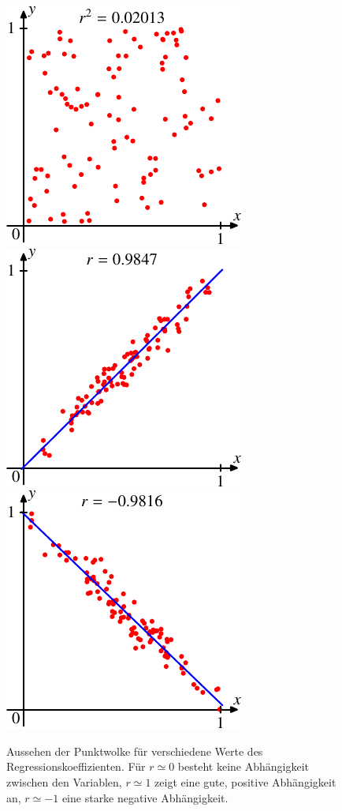 \begin{figure}
\centering
\includegraphics{images/regression-2.pdf}\;
\includegraphics{images/regression-3.pdf}\;
\includegraphics{images/regression-4.pdf}
\caption{Aussehen der Punktwolke für verschiedene Werte des Regressionskoeffizienten.
Für $r\simeq 0$ besteht keine Abhängigkeit zwischen den Variablen, $r\simeq 1$
zeigt eine gute, positive Abhängigkeit an, $r\simeq -1$ eine starke
negative Abhängigkeit.
\label{regressionskoeffizient-graphik}}
\end{figure}

